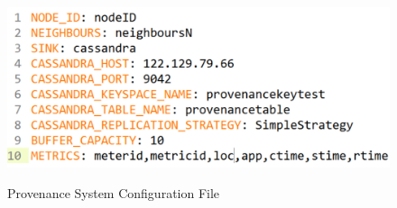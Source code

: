\begin{figure}[h]
\centering
\includegraphics[width=\linewidth]{figures/conf.png}\\
\caption{Provenance System Configuration File}
\label{provenance_conf}
\end{figure}
